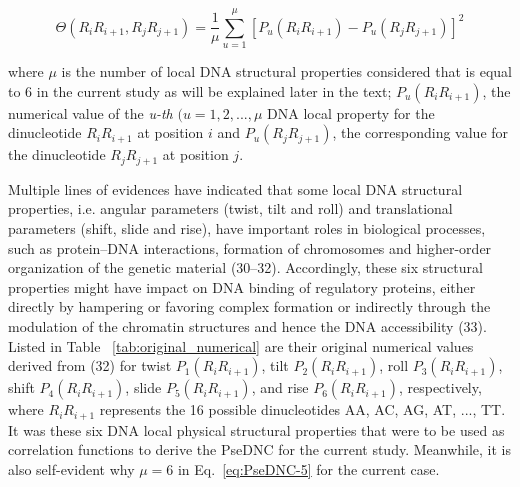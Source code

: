 \begin{equation}\label{eq:PseDNC-5}
    \Theta(R_{i}R_{i+1}, R_{j}R_{j+1}) = \frac{1}{\mu}\sum_{u=1}^{\mu}[P_{u} (R_{i}R_{i+1}) - P_{u}(R_{j}R_{j+1})]^{2}
\end{equation}

where $\mu$ is the number of local DNA structural properties considered that is equal to 6 in the current study as will be explained later in the text; $P_{u} (R_{i}R_{i+1})$⁠, the numerical value of the \textit{u-th} $(u = 1,2,...,\mu$ DNA local property for the dinucleotide $R_{i}R_{i+1}$ at position $i$ and $P_{u}(R_{j}R_{j+1})$⁠, the corresponding value for the dinucleotide $R_{j}R_{j+1}$ at position $j$.

Multiple lines of evidences have indicated that some local DNA structural properties, i.e. angular parameters (twist, tilt and roll) and translational parameters (shift, slide and rise), have important roles in biological processes, such as protein–DNA interactions, formation of chromosomes and higher-order organization of the genetic material (30–32). Accordingly, these six structural properties might have impact on DNA binding of regulatory proteins, either directly by hampering or favoring complex formation or indirectly through the modulation of the chromatin structures and hence the DNA accessibility (33). Listed in Table
~\ref{tab:original_numerical} are their original numerical values derived from (32) for twist $P_{1}(R_{i}R_{i+1})$⁠, tilt $P_{2}(R_{i}R_{i+1})$⁠, roll $P_{3}(R_{i}R_{i+1})$⁠, shift $P_{4}(R_{i}R_{i+1})$⁠, slide $P_{5}(R_{i}R_{i+1})$⁠, and rise $P_{6}(R_{i}R_{i+1})$⁠, respectively, where $R_{i}R_{i+1}$ represents the 16 possible dinucleotides AA, AC, AG, AT, ..., TT. It was these six DNA local physical structural properties that were to be used as correlation functions to derive the \gls{PseDNC} for the current study. Meanwhile, it is also self-evident why $\mu=6$ in Eq.~\ref{eq:PseDNC-5} for the current case.



